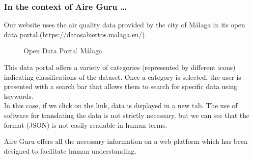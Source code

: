 \subsubsection*{In the context of Aire Guru \ldots} 

Our website uses the air quality data provided by the city of Málaga in its open data portal.(https://datosabiertos.malaga.eu/)\\

\begin{figure}[ht]
    \centering
    \hfill
    \vfill
    \caption{Open Data Portal Málaga}
\end{figure}

This data portal offers a variety of categories (represented by different icons) indicating classifications of the dataset.
Once a category is selected, the user is presented with a search bar that allows them to search for specific data using keywords.\\

In this case, if we click on the link, data is displayed in a new tab. The use of software
for translating the data is not strictly necessary, but we can see that the format (JSON) is not easily readable in human terms.

Aire Guru offers all the necessary information on a web platform which has been designed to facilitate human understanding.